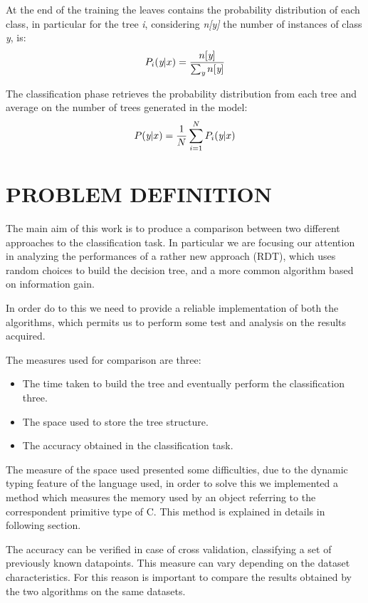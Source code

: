 \documentclass{acm_proc_article-sp-sigmod07}
\begin{document}
At the end of the training the leaves contains the probability distribution
of each class, in particular for the tree \emph{i}, considering
\emph{n[y]} the number of instances of class \emph{y}, is:
\begin{equation}
	P_i(\emph{y}|x) = \frac{n[\emph{y}]}{\sum_\emph{y} n[\emph{y}]}
\end{equation}

The classification phase retrieves the probability distribution from each
tree and average on the number of trees generated in the model:
\begin{equation}
	P(\emph{y}|x) = \frac{1}{N} \sum_{i=1}^N P_i(\emph{y}|x)
\end{equation}


\section{PROBLEM DEFINITION}
The main aim of this work is to produce a comparison between two different
approaches to the classification task. In particular we are focusing our
attention in analyzing the performances of a rather new approach (RDT),
which uses random choices to build the decision tree, and a more common
algorithm based on information gain.

In order do to this we need to provide a reliable implementation of both
the algorithms, which permits us to perform some test and analysis on the
results acquired.

The measures used for comparison are three:
\begin{itemize}
\item The time taken to build the tree and eventually perform the
classification three.
\item The space used to store the tree structure.
\item The accuracy obtained in the classification task.
\end{itemize}

The measure of the space used presented some difficulties, due to the
dynamic typing feature of the language used, in order to solve this we
implemented a method which measures the memory used by an object referring
to the correspondent primitive type of C. This method is explained in
details in following section.

The accuracy can be verified in case of cross validation, classifying a
set of previously known datapoints. This measure can vary depending on the
dataset characteristics. For this reason is important to compare the
results obtained by the two algorithms on the same datasets.
\end{document}
